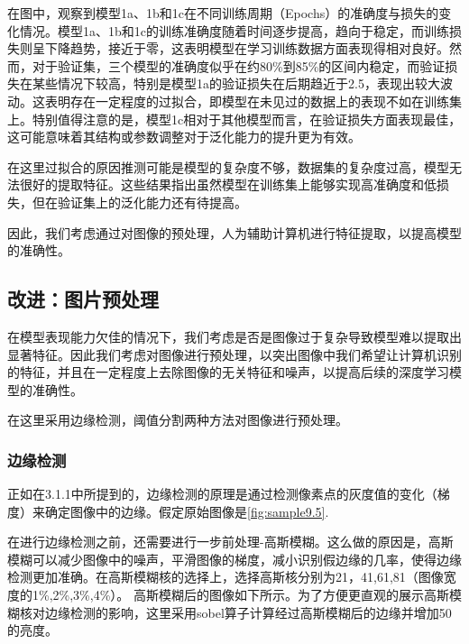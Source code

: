 在图中，观察到模型1a、1b和1c在不同训练周期（Epochs）的准确度与损失的变化情况。模型1a、1b和1c的训练准确度随着时间逐步提高，趋向于稳定，而训练损失则呈下降趋势，接近于零，这表明模型在学习训练数据方面表现得相对良好。然而，对于验证集，三个模型的准确度似乎在约80\%到85\%的区间内稳定，而验证损失在某些情况下较高，特别是模型1a的验证损失在后期趋近于2.5，表现出较大波动。这表明存在一定程度的过拟合，即模型在未见过的数据上的表现不如在训练集上。特别值得注意的是，模型1c相对于其他模型而言，在验证损失方面表现最佳，这可能意味着其结构或参数调整对于泛化能力的提升更为有效。

在这里过拟合的原因推测可能是模型的复杂度不够，数据集的复杂度过高，模型无法很好的提取特征。这些结果指出虽然模型在训练集上能够实现高准确度和低损失，但在验证集上的泛化能力还有待提高。

因此，我们考虑通过对图像的预处理，人为辅助计算机进行特征提取，以提高模型的准确性。

\FloatBarrier


\subsection{改进：图片预处理}

在模型表现能力欠佳的情况下，我们考虑是否是图像过于复杂导致模型难以提取出显著特征。因此我们考虑对图像进行预处理，以突出图像中我们希望让计算机识别的特征，并且在一定程度上去除图像的无关特征和噪声，以提高后续的深度学习模型的准确性。


在这里采用边缘检测，阈值分割两种方法对图像进行预处理。


\subsubsection{边缘检测}

正如在3.1.1中所提到的，边缘检测的原理是通过检测像素点的灰度值的变化（梯度）来确定图像中的边缘。假定原始图像是\autoref{fig:sample9.5}.

在进行边缘检测之前，还需要进行一步前处理-高斯模糊。这么做的原因是，高斯模糊可以减少图像中的噪声，平滑图像的梯度，减小识别假边缘的几率，使得边缘检测更加准确。\cite{4.3}在高斯模糊核的选择上，选择高斯核分别为21，41,61,81（图像宽度的1\%,2\%,3\%,4\%）。
高斯模糊后的图像如下所示。为了方便更直观的展示高斯模糊核对边缘检测的影响，这里采用sobel算子计算经过高斯模糊后的边缘并增加50的亮度。

